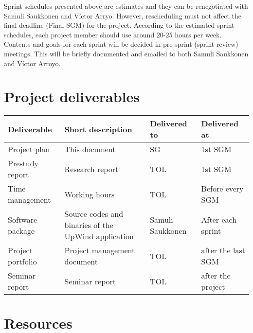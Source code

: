 \documentclass[12pt,titlepage,a4paper]{article}
\begin{document}
			Sprint schedules presented above are estimates and they can be renegotiated with Samuli Saukkonen and 					Víctor Arryo.
			However, rescheduling must not affect the final deadline (Final SGM) for the project.
			According to the estimated sprint schedules, each project member should use around 20-25 hours per week.
			Contents and goals for each sprint will be decided in pre-sprint (sprint review) meetings.
			This will be briefly documented and emailed to both Samuli Saukkonen and Víctor Arroyo.


\section{Project deliverables}

			\begin{center}
			\begin{tabular}{|l|p{4cm}|l|l|}
				\hline
				\textbf{Deliverable} & \textbf{Short description} & \textbf{Delivered to} & \textbf{Delivered at}\\
				\hline
				\hline
				Project plan & This document & SG & 1st SGM \\
				\hline
				Prestudy report & Research report & TOL & 1st SGM \\
				\hline
				Time management & Working hours & TOL & Before every SGM\\
				\hline
				Software package & Source codes and binaries of the UpWind application & Samuli Saukkonen & After each sprint\\
				\hline
				Project portfolio & Project management document & TOL & after the last SGM \\
				\hline
				Seminar report & Seminar report & TOL & after the project \\
				\hline
			\end{tabular}
			\end{center}

\section{Resources}
\end{document}
